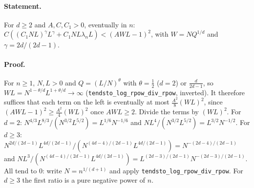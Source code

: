 \paragraph{Statement.} For $d\ge2$ and $A,C,C_1>0$, eventually in $n$:
$C((C_1NL)^\gamma L^\gamma+C_1NL\lambda_nL)<(AWL-1)^2$, with $W=NQ^{1/d}$ and $\gamma=2d/(2d-1)$.
\paragraph{Proof.} For $n\ge1$, $N,L>0$ and $Q=(L/N)^\theta$ with $\theta=\frac12$ ($d=2$) or
$\frac d{2d-1}$, so $WL=N^{1-\theta/d}L^{1+\theta/d}\to\infty$ (\texttt{tendsto\_log\_rpow\_div\_rpow},
inverted). It therefore suffices that each term on the left is eventually at most
$\frac{A^2}8(WL)^2$, since $(AWL-1)^2\ge\frac{A^2}4(WL)^2$ once $AWL\ge2$. Divide the terms by
$(WL)^2$. For $d=2$: $N^{4/3}L^{8/3}/(N^{3/2}L^{5/2})=L^{1/6}N^{-1/6}$ and
$NL^4/(N^{3/2}L^{5/2})=L^{3/2}N^{-1/2}$. For $d\ge3$: $N^{2d/(2d-1)}L^{4d/(2d-1)}/(N^{(4d-4)/(2d-1)}L^{4d/(2d-1)})=N^{-(2d-4)/(2d-1)}$
and $NL^3/(N^{(4d-4)/(2d-1)}L^{4d/(2d-1)})=L^{(2d-3)/(2d-1)}N^{-(2d-3)/(2d-1)}$. All tend to $0$:
write $N=n^{1/(d+1)}$ and apply \texttt{tendsto\_log\_rpow\_div\_rpow}. For $d\ge3$ the first ratio
is a pure negative power of $n$.
